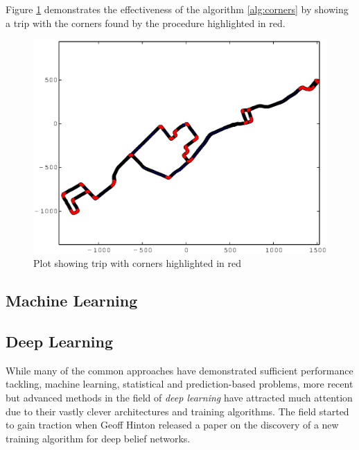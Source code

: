 \documentclass[a4paper, 11pt, twocolumn]{report}
\begin{document}
Figure \ref{fig:corners} demonstrates the effectiveness of the algorithm \ref{alg:corners} by showing a trip with the corners found by the procedure highlighted in red. 

\begin{figure}[h]
    \center
    \includegraphics[width=\linewidth]{corners}
    \caption{Plot showing trip with corners highlighted in red}
    \label{fig:corners}
\end{figure}
\subsection{Machine Learning}



















\subsection{Deep Learning}

While many of the common approaches have demonstrated sufficient performance tackling, machine learning, statistical and prediction-based problems, more recent but advanced methods in the field of \textit{deep learning} have attracted much attention due to their vastly clever architectures and training algorithms.
The field started to gain traction when Geoff Hinton \cite{hinton2006fast} released a paper on the discovery of a new training algorithm for deep belief networks.
\end{document}
